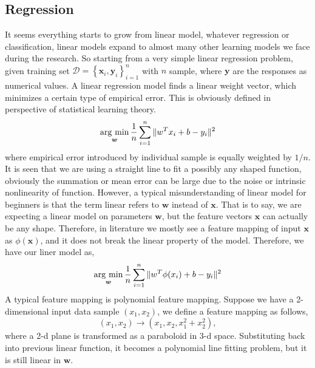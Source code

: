 \documentclass{article}
\newcommand{\vct}[1]{\ensuremath{\boldsymbol{#1}}} %
\newcommand{\set}[1]{\ensuremath{\mathcal{#1}}}
\newcommand{\argmin}{\operatornamewithlimits{\arg\,\min}}
\begin{document}
\subsection{Regression}
It seems everything starts to grow from linear model, whatever regression or classification, linear models expand to almost many other learning models we face during the research. So starting from a very simple linear regression problem, given training set $\set D = \left\{ \vct x_i, \vct y_i \right\}_{i=1}^n $ with $ n $ sample, where $ \vct y $ are the responses as numerical values. A linear regression model finds a linear weight vector, which minimizes a certain type of empirical error. This is obviously defined in perspective of statistical learning theory. 
\begin{equation}
\argmin_{\vct w} \frac{1}{n}\sum_{i=1}^n \| w^T x_i + b - y_i\|^2
\end{equation}
where empirical error introduced by individual sample is equally weighted by $ 1/n $. It is seen that we are using a straight line to fit a possibly any shaped function, obviously the summation or mean error can be large due to the noise or intrinsic nonlinearity of function. However, a typical misunderstanding of linear model for beginners is that the term linear refers to $ \vct w $ instead of $ \vct x $. That is to say, we are expecting a linear model on parameters $ \vct w $, but the feature vectors $ \vct x $ can actually be any shape. Therefore, in literature we mostly see a feature mapping of input $ \vct x $ as $ \phi(\vct x) $, and it does not break the linear property of the model. Therefore, we have our liner model as,
\begin{equation}
\argmin_{\vct w} \frac{1}{n}\sum_{i=1}^n \| w^T \phi(x_i) + b - y_i\|^2
\label{eq:linear_reg}
\end{equation}
A typical feature mapping is polynomial feature mapping. Suppose we have a 2-dimensional input data sample $ \left( x_1, x_2 \right) $, we define a feature mapping as follows,
\[ \left( x_1, x_2 \right) \rightarrow \left( x_1, x_2, x_1^2+x_2^2 \right), \] where a 2-d plane is transformed as a paraboloid in 3-d space. Substituting back into previous linear function, it becomes a polynomial line fitting problem, but it is still linear in $ \vct w $.
\end{document}
